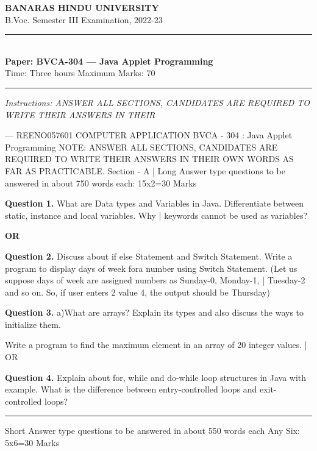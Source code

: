 \documentclass[11pt,a4paper]{article}
\begin{document}
\begin{center}
  {\large\bfseries BANARAS HINDU UNIVERSITY}\\[2pt]
  {\normalsize B.Voc. Semester III Examination, 2022-23}\\[6pt]
  \rule{0.8\linewidth}{0.5pt}\\[6pt]
  {\large\bfseries Paper: BVCA-304 --- Java Applet Programming}\\[4pt]
  {\normalsize Time: Three hours \hfill Maximum Marks: 70}
\end{center}

\rule{\linewidth}{0.4pt}

\smallskip
\noindent\textit{Instructions: ANSWER ALL SECTIONS, CANDIDATES ARE REQUIRED TO WRITE THEIR ANSWERS IN THEIR}

\bigskip

— REENO057601
COMPUTER APPLICATION
BVCA - 304 : Java Applet Programming
NOTE: ANSWER ALL SECTIONS, CANDIDATES ARE REQUIRED TO WRITE THEIR ANSWERS IN THEIR
OWN WORDS AS FAR AS PRACTICABLE.
Section - A |
Long Answer type questions to be answered in about 750 words each: 15x2=30 Marks

\medskip\noindent\textbf{Question 1.} What are Data types and Variables in Java. Differentiate between static, instance and local variables. Why |
keywords cannot be used as variables?
\centerline{\textbf{OR}}

\medskip\noindent\textbf{Question 2.} Discuss about if else Statement and Switch Statement. Write a program to display days of week fora
number using Switch Statement. (Let us suppose days of week are assigned numbers as Sunday-0, Monday-1, |
Tuesday-2 and so on. So, if user enters 2 value 4, the output should be Thursday)

\medskip\noindent\textbf{Question 3.} a)What are arrays? Explain its types and also discuss the ways to initialize them.
\begin{parts}
  \item Write a program to find the maximum element in an array of 20 integer values. |
OR
\end{parts}

\medskip\noindent\textbf{Question 4.} Explain about for, while and do-while loop structures in Java with example. What is the difference
between entry-controlled loops and exit-controlled loops?

\bigskip{}
\rule{\linewidth}{0.4pt}\smallskip

Short Answer type questions to be answered in about 550 words each Any Six: 5x6=30 Marks
\end{document}
